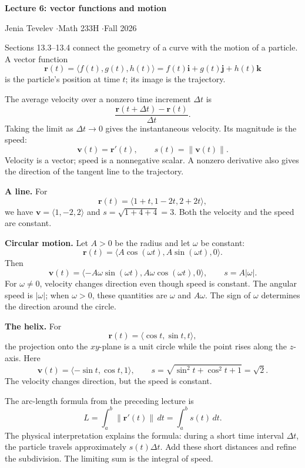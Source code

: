 \documentclass[11pt,letterpaper]{article}
\newcommand{\R}{\mathbf r}
\newcommand{\V}{\mathbf v}
\newcommand{\ii}{\mathbf i}
\newcommand{\jj}{\mathbf j}
\newcommand{\kk}{\mathbf k}
\newcommand{\norm}[1]{\left\lVert#1\right\rVert}
\newcommand{\heading}[1]{\vspace{5pt}{\large\bfseries #1}\par}
\newcommand{\subhead}[1]{\textbf{#1}\quad}
\begin{document}
\providecommand{\startpage}{1}
\setcounter{page}{\startpage}
{\LARGE\bfseries Lecture 6: vector functions and motion}\par
Jenia Tevelev \enspace$\cdot$\enspace Math 233H \enspace$\cdot$\enspace Fall 2026

Sections 13.3--13.4 connect the geometry of a curve with the motion of a particle. A vector function
\[
 \R(t)=\langle f(t),g(t),h(t)\rangle
       =f(t)\ii+g(t)\jj+h(t)\kk
\]
is the particle's position at time $t$; its image is the trajectory.

\heading{Velocity and speed}
The average velocity over a nonzero time increment $\Delta t$ is
\[
 \frac{\R(t+\Delta t)-\R(t)}{\Delta t}.
\]
Taking the limit as $\Delta t\to0$ gives the instantaneous velocity. Its magnitude is the speed:
\[
 \boxed{\V(t)=\R'(t),\qquad s(t)=\norm{\V(t)}.}
\]
Velocity is a vector; speed is a nonnegative scalar. A nonzero derivative also gives the direction of the tangent line to the trajectory.

\heading{Three examples}
\subhead{A line.} For
\[
 \R(t)=\langle1+t,1-2t,2+2t\rangle,
\]
we have $\V=\langle1,-2,2\rangle$ and $s=\sqrt{1+4+4}=3$. Both the velocity and the speed are constant.

\subhead{Circular motion.} Let $A>0$ be the radius and let $\omega$ be constant:
\[
 \R(t)=\langle A\cos(\omega t),A\sin(\omega t),0\rangle.
\]
Then
\[
 \V(t)=\langle-A\omega\sin(\omega t),A\omega\cos(\omega t),0\rangle,
 \qquad s=A|\omega|.
\]
For $\omega\ne0$, velocity changes direction even though speed is constant. The angular speed is $|\omega|$; when $\omega>0$, these quantities are $\omega$ and $A\omega$. The sign of $\omega$ determines the direction around the circle.

\subhead{The helix.} For
\[
 \R(t)=\langle\cos t,\sin t,t\rangle,
\]
the projection onto the $xy$-plane is a unit circle while the point rises along the $z$-axis. Here
\[
 \V(t)=\langle-\sin t,\cos t,1\rangle,
 \qquad s=\sqrt{\sin^2t+\cos^2t+1}=\sqrt2.
\]
The velocity changes direction, but the speed is constant.

\newpage
\heading{Arc length as accumulated distance}
The arc-length formula from the preceding lecture is
\[
 \boxed{L=\int_a^b\norm{\R'(t)}\,dt=\int_a^b s(t)\,dt.}
\]
The physical interpretation explains the formula: during a short time interval $\Delta t$, the particle travels approximately $s(t)\Delta t$. Add these short distances and refine the subdivision. The limiting sum is the integral of speed.
\end{document}
